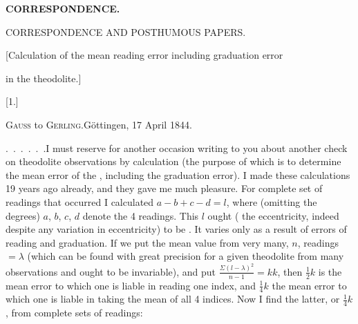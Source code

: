 \par\clearpage
\noindent{}\hfill{\small\textbf{CORRESPONDENCE.}}\hfill\null\par
\vspace*{3.2cm}
\begin{center}
{\LARGE CORRESPONDENCE AND POSTHUMOUS PAPERS.}\par
\vspace{1.5cm}
{\large [Calculation of the mean reading error including graduation error\par in the theodolite.]}\par
\bigskip\bigskip
{\large [1.]}\par\medskip
{\large\textsc{Gauss} to \textsc{Gerling}.\quad Göttingen, 17 April 1844.}
\end{center}
\par\noindent\hspace*{\parindent}.\ .\ .\ .\ .\ .\enspace I must reserve for another occasion writing to you about another check on theodolite observations by calculation (the purpose of which is to determine the mean error of the , including the graduation error). I made these calculations 19 years ago already, and they gave me much pleasure. For  complete set of readings that occurred I calculated $a-b+c-d=l$, where (omitting the degrees) $a$, $b$, $c$, $d$ denote the 4 readings. This $l$ ought ( the eccentricity, indeed despite any variation in eccentricity) to be . It varies only as a result of errors of reading and graduation. If we put the mean value from very many, $n$, readings $=\lambda$ (which can be found with great precision for a given theodolite from many observations and ought to be invariable), and put $\frac{\Sigma(l-\lambda)^2}{n-1}=kk$, then $\frac12k$ is the mean error to which one is liable in reading one index, and $\frac14k$ the mean error to which one is liable in taking the mean of all 4 indices. Now I find the latter, or $\frac14k$, from complete sets of readings:

